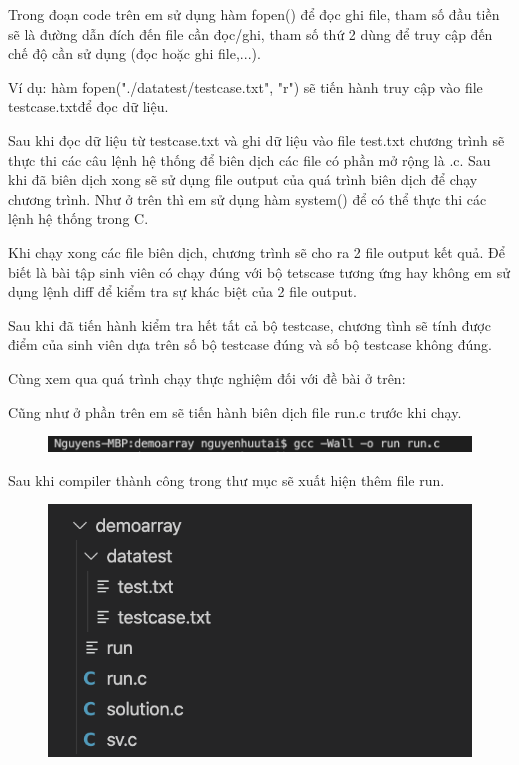 \documentclass[12pt,a4paper]{report}
\begin{document}
Trong đoạn code trên em sử dụng hàm fopen() để đọc ghi file, tham số đầu tiền sẽ là đường dẫn đích đến file cần đọc/ghi, tham số thứ 2 dùng để truy cập đến chế độ cần sử dụng (đọc hoặc ghi file,...).

Ví dụ: hàm fopen("./datatest/testcase.txt", "r") sẽ tiến hành truy cập vào file testcase.txtđể đọc dữ liệu.

Sau khi đọc dữ liệu từ testcase.txt và ghi dữ liệu vào file test.txt chương trình sẽ thực thi các câu lệnh hệ thống để biên dịch các file có phần mở rộng là .c. Sau khi đã biên dịch xong sẽ sử dụng file output của quá trình biên dịch để chạy chương trình. Như ở trên thì em sử dụng hàm system() để có thể thực thi các lệnh hệ thống trong C.

Khi chạy xong các file biên dịch, chương trình sẽ cho ra 2 file output kết quả. Để biết là bài tập sinh viên có chạy đúng với bộ tetscase tương ứng hay không em sử dụng lệnh diff để kiểm tra sự khác biệt của 2 file output.

Sau khi đã tiến hành kiểm tra hết tất cả bộ testcase, chương tình sẽ tính được điểm của sinh viên dựa trên số bộ testcase đúng và số bộ testcase không đúng.

Cùng xem qua quá trình chạy thực nghiệm đối với đề bài ở trên:

Cũng như ở phần trên em sẽ tiến hành biên dịch file run.c trước khi chạy.

\begin{figure}[ht]
\begin{center}
\includegraphics[scale=.4]{hinhanh/compilerdemoarray.png}
\end{center}
\end{figure}

Sau khi compiler thành công trong thư mục sẽ xuất hiện thêm file run.

\begin{figure}[ht]
\begin{center}
\includegraphics[scale=.4]{hinhanh/cautrucarraysaucompiler.png}
\end{center}
\end{figure}
\end{document}
